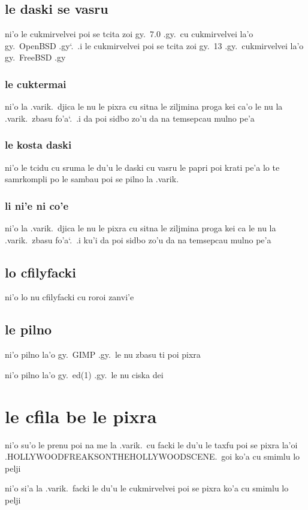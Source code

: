 \documentclass{report}
\newcommand\sds{\spacefactor\sfcode`.\ \space}
\begin{document}
\subsection{le daski se vasru}
ni'o le cukmirvelvei poi se tcita zoi gy.\ 7.0 .gy.\ cu cukmirvelvei la'o gy.\ OpenBSD .gy\sds  .i le cukmirvelvei poi se tcita zoi gy.\ 13 .gy.\ cukmirvelvei la'o gy.\ FreeBSD .gy

\subsubsection{le cuktermai}
ni'o la .varik.\ djica le nu le pixra cu sitna le ziljmina proga kei ca'o le nu la .varik.\ zbasu fo'a\sds  .i da poi sidbo zo'u da na temsepcau mulno pe'a

\subsubsection{le kosta daski}
ni'o le tcidu cu sruma le du'u le daski cu vasru le papri poi krati pe'a lo te samrkompli po le sambau poi se pilno la .varik.

\subsubsection{li ni'e ni co'e}
ni'o la .varik.\ djica le nu le pixra cu sitna le ziljmina proga kei ca le nu la .varik.\ zbasu fo'a\sds  .i ku'i da poi sidbo zo'u da na temsepcau mulno pe'a

\subsection{lo cfilyfacki}
ni'o lo nu cfilyfacki cu roroi zanvi'e

\subsection{le pilno}
ni'o pilno la'o gy.\ GIMP .gy.\ le nu zbasu ti poi pixra

ni'o pilno la'o gy.\ ed(1) .gy.\ le nu ciska dei

\section{le cfila be le pixra}
ni'o su'o le prenu poi na me la .varik.\ cu facki le du'u le taxfu poi se pixra la'oi .HOLLYWOODFREAKSONTHEHOLLYWOODSCENE.\ goi ko'a cu smimlu lo pelji

ni'o si'a la .varik.\ facki le du'u le cukmirvelvei poi se pixra ko'a cu smimlu lo pelji
\end{document}
